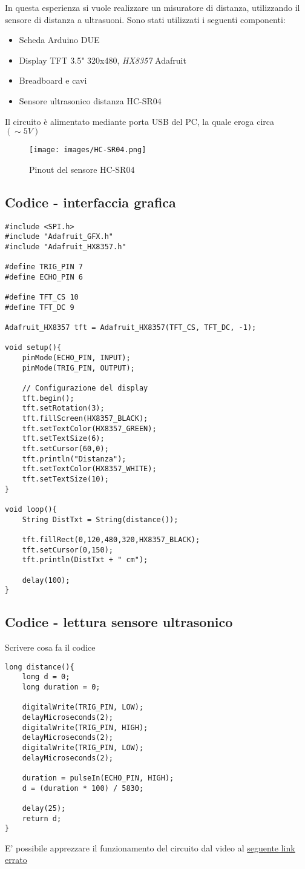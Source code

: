 In questa esperienza si vuole realizzare un misuratore di distanza, utilizzando il sensore di distanza a ultrasuoni. Sono stati utilizzati i seguenti componenti:
\begin{itemize}
    \item Scheda Arduino DUE
    \item Display TFT 3.5" 320x480, \textit{HX8357} Adafruit
    \item Breadboard e cavi
    \item Sensore ultrasonico distanza HC-SR04
\end{itemize}
Il circuito è alimentato mediante porta USB del PC, la quale eroga circa $(\sim 5 V)$
\begin{figure}[H]
    \centering
    \texttt{[image: images/HC-SR04.png]}
    \caption{Pinout del sensore HC-SR04}
    \label{fig:HC-SR04}
\end{figure}
\subsection{Codice - interfaccia grafica}
\begin{lstlisting}[frame=single, language=Arduino]
#include <SPI.h>
#include "Adafruit_GFX.h"
#include "Adafruit_HX8357.h"

#define TRIG_PIN 7
#define ECHO_PIN 6

#define TFT_CS 10
#define TFT_DC 9

Adafruit_HX8357 tft = Adafruit_HX8357(TFT_CS, TFT_DC, -1); 

void setup(){
    pinMode(ECHO_PIN, INPUT);
    pinMode(TRIG_PIN, OUTPUT);
    
    // Configurazione del display
    tft.begin();
    tft.setRotation(3);
    tft.fillScreen(HX8357_BLACK);
    tft.setTextColor(HX8357_GREEN);
    tft.setTextSize(6);
    tft.setCursor(60,0);
    tft.println("Distanza");
    tft.setTextColor(HX8357_WHITE);
    tft.setTextSize(10);
}

void loop(){
    String DistTxt = String(distance());
    
    tft.fillRect(0,120,480,320,HX8357_BLACK);
    tft.setCursor(0,150);
    tft.println(DistTxt + " cm");
    
    delay(100);
}
\end{lstlisting}
\subsection{Codice - lettura sensore ultrasonico}
Scrivere cosa fa il codice
\begin{lstlisting}[frame=single, language=Arduino]
long distance(){
    long d = 0;
    long duration = 0;
    
    digitalWrite(TRIG_PIN, LOW);
    delayMicroseconds(2);
    digitalWrite(TRIG_PIN, HIGH);
    delayMicroseconds(2);
    digitalWrite(TRIG_PIN, LOW);
    delayMicroseconds(2);
    
    duration = pulseIn(ECHO_PIN, HIGH);
    d = (duration * 100) / 5830;
    
    delay(25);
    return d;
}
\end{lstlisting}
E' possibile apprezzare il funzionamento del circuito dal video al \href{}{seguente link errato}